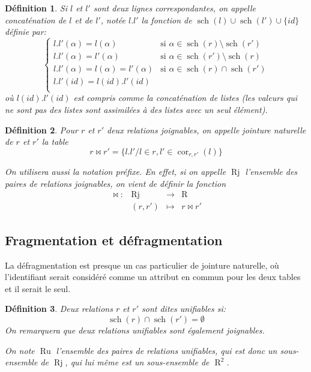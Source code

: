 \documentclass[french]{article}
\DeclareMathOperator{\R}{R}
\DeclareMathOperator{\s}{sch}
\DeclareMathOperator{\ru}{Ru}
\DeclareMathOperator{\cor}{cor}
\DeclareMathOperator{\rj}{Rj}
\newtheorem{defi}{Définition}
\begin{document}
\begin{defi}
	Si $l$ et $l'$ sont deux lignes correspondantes,
	on appelle \emph{concaténation de $l$ et de $l'$},
	notée $l.l'$ la fonction de $\s(l) \cup \s(l') \cup \{id\}$
	définie par:
	$$
	\left\lbrace
	\begin{array}{ll}
	l.l'(\alpha)  = l(\alpha) & \text{si $\alpha \in \s(r) \setminus \s(r')$} \\
	l.l'(\alpha)  = l'(\alpha) & \text{si $\alpha \in \s(r') \setminus \s(r)$} \\
	l.l'(\alpha)  = l(\alpha) = l'(\alpha) & \text{si $\alpha \in \s(r) \cap \s(r')$} \\
	l.l'(id)  = l(id).l'(id) &  \\
	\end{array}
	\right.
	$$
	où $l(id).l'(id)$ est compris comme la concaténation de listes
	(les valeurs qui ne sont pas des listes sont assimilées
	à des listes avec un seul élément).
\end{defi}

\begin{defi}
	Pour $r$ et $r'$ deux relations joignables,
	on appelle \emph{jointure naturelle}
	de $r$ et $r'$ la table
	$$
	r \Join r' = \{l.l' / l \in r, l' \in \cor_{r, r'}(l) \}
	$$
	
	On utilisera aussi la notation préfixe.
	En effet, si on appelle $\rj$ l'ensemble
	des paires de relations joignables,
	on vient de définir la fonction
	$$
	\begin{array}{llcl}
	\Join : & \rj & \rightarrow & \R \\
			& (r, r') & \mapsto & r \Join r'
	\end{array}
	$$
\end{defi}

\subsection*{Fragmentation et défragmentation}
La défragmentation est presque un cas particulier de jointure naturelle,
où l'identifiant serait considéré comme un attribut en commun pour les deux tables
et il serait le seul.

\begin{defi}
	Deux relations $r$ et $r'$ sont dites \emph{unifiables}
	si:
	$$
	\s(r) \cap \s(r') = \emptyset
	$$
	On remarquera que deux relations unifiables sont également joignables.
	
	On note $\ru$ l'ensemble des paires de relations unifiables,
	qui est donc un sous-ensemble de $\rj$, qui lui même
	est un sous-ensemble de $\R^2$.
\end{defi}
\end{document}
